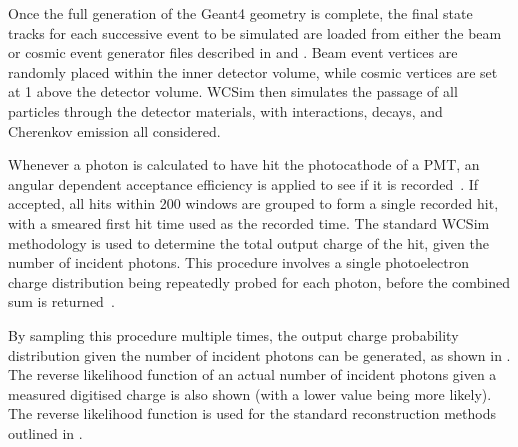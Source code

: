 Once the full generation of the Geant4 geometry is complete, the final state tracks for each
successive event to be simulated are loaded from either the beam or cosmic event generator files
described in  and
. Beam event vertices are randomly placed within the
inner detector volume, while cosmic vertices are set at \SI{1}{} above the detector
volume. WCSim then simulates the passage of all particles through the detector materials, with
interactions, decays, and Cherenkov emission all considered.

Whenever a photon is calculated to have hit the photocathode of a PMT, an angular dependent
acceptance efficiency is applied to see if it is recorded~\cite{hamamatsu_handbook}. If accepted,
all hits within \SI{200}{} windows are grouped to form a single recorded hit, with a
smeared first hit time used as the recorded time. The standard WCSim methodology is used to
determine the total output charge of the hit, given the number of incident photons. This procedure
involves a single photoelectron charge distribution being repeatedly probed for each photon,
before the combined sum is returned~\cite{tutorial2020}.

By sampling this procedure multiple times, the output charge probability distribution given the
number of incident photons can be generated, as shown in . The reverse
likelihood function of an actual number of incident photons given a measured digitised charge is
also shown (with a lower value being more likely). The reverse likelihood function is used for the
standard reconstruction methods outlined in .

